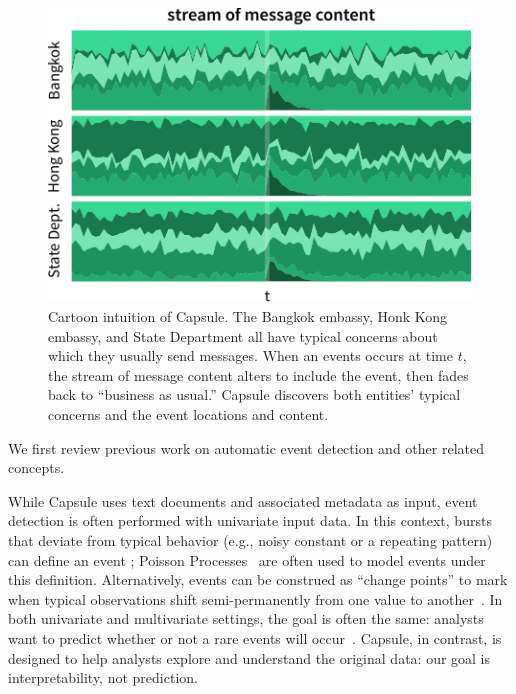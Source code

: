 \begin{figure}
\centering
\includegraphics[width=\linewidth]{fig/cartoon.pdf}
\caption{Cartoon intuition of Capsule.  The Bangkok embassy, Honk Kong embassy, and State Department all have typical concerns about which they usually send messages.  When an events occurs at time $t$, the stream of message content alters to include the event, then fades back to ``business as usual.''  Capsule discovers both entities' typical concerns and the event locations and content.}
\label{fig:cartoon}
\end{figure}



  We first review previous work on automatic event detection and other related concepts.  

While Capsule uses text documents and associated metadata as input, event detection is often performed with univariate input data.  In this context, bursts that deviate from typical behavior (e.g., noisy constant or a repeating pattern) can define an event \cite{kleinberg2003bursty,ihler2007learning}; Poisson Processes~\cite{Kingman:1993} are often used to model events under this definition.  Alternatively, events can be construed as ``change points'' to mark when typical observations shift semi-permanently from one value to another~\cite{guralnik1999event}.
In both univariate and multivariate settings, the goal is often the same: analysts want to predict whether or not a rare events will occur~\cite{weiss1998learning,das2008anomaly}.  Capsule, in contrast, is designed to help analysts explore and understand the original data: our goal is interpretability, not prediction.

